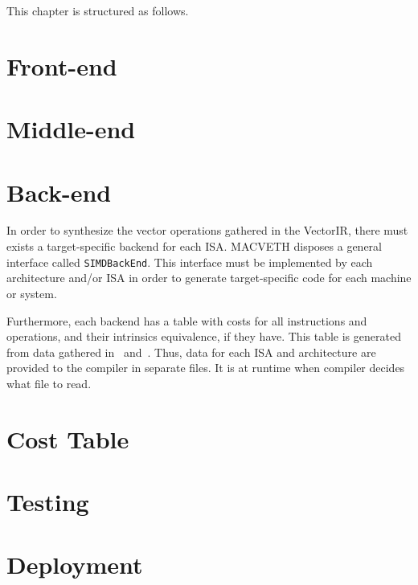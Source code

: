 This chapter is structured as follows.
\section{Front-end}
\section{Middle-end}
\section{Back-end}
In order to synthesize the vector operations gathered in the VectorIR, there
must exists a target-specific backend for each ISA. MACVETH disposes a general
interface called \texttt{SIMDBackEnd}. This interface must be
implemented by each architecture and/or ISA in order to generate
target-specific code for each machine or system.

Furthermore, each backend has a table with costs for all instructions and 
operations, and their intrinsics equivalence, if they have. This table is 
generated from data gathered in~\cite{bib:uops} and~\cite{bib:intrinsics}. 
Thus, data for each ISA and architecture are provided to the compiler in 
separate files. It is at runtime when compiler decides what file to read.
\section{Cost Table}
\section{Testing}
\section{Deployment}